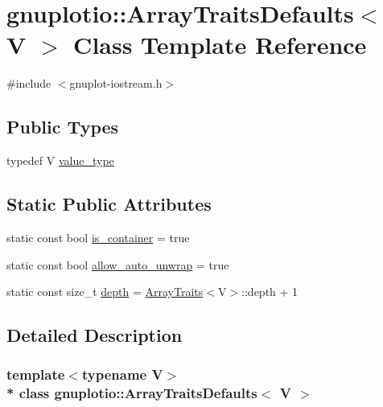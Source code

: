 \hypertarget{classgnuplotio_1_1_array_traits_defaults}{}\section{gnuplotio\+:\+:Array\+Traits\+Defaults$<$ V $>$ Class Template Reference}
\label{classgnuplotio_1_1_array_traits_defaults}


{\ttfamily \#include $<$gnuplot-\/iostream.\+h$>$}

\subsection*{Public Types}
\begin{DoxyCompactItemize}
\item 
typedef V \hyperlink{classgnuplotio_1_1_array_traits_defaults_ad7a9e8d19419fabe2ab9cc1b76c9965b}{value\+\_\+type}
\end{DoxyCompactItemize}
\subsection*{Static Public Attributes}
\begin{DoxyCompactItemize}
\item 
static const bool \hyperlink{classgnuplotio_1_1_array_traits_defaults_a57bab5bf3617f0ee66fdd4dcb751aa21}{is\+\_\+container} = true
\item 
static const bool \hyperlink{classgnuplotio_1_1_array_traits_defaults_ac8d430cba6ceefc6f52706455f12a0e8}{allow\+\_\+auto\+\_\+unwrap} = true
\item 
static const size\+\_\+t \hyperlink{classgnuplotio_1_1_array_traits_defaults_ac51367f5da9096249b162af1496e36ab}{depth} = \hyperlink{classgnuplotio_1_1_array_traits}{Array\+Traits}$<$V$>$\+::depth + 1
\end{DoxyCompactItemize}


\subsection{Detailed Description}
\subsubsection*{template$<$typename V$>$\\*
class gnuplotio\+::\+Array\+Traits\+Defaults$<$ V $>$}



